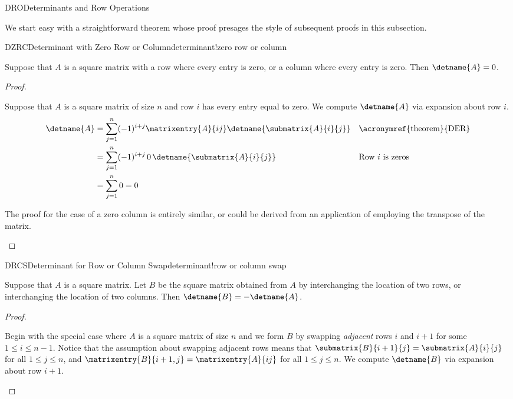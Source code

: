 \begin{subsect}{DRO}{Determinants and Row Operations}
%
\begin{para}We start easy with a straightforward theorem whose proof presages the style of subsequent proofs in this subsection.\end{para}
%
\begin{theorem}{DZRC}{Determinant with Zero Row or Column}{determinant!zero row or column}
\begin{para}Suppose that $A$ is a square matrix with a row where every entry is zero, or a column where every entry is zero.  Then $\detname{A}=0$.\end{para}
\end{theorem}
%
\begin{proof}
\begin{para}Suppose that $A$ is a square matrix of size $n$ and row $i$ has every entry equal to zero.  We compute $\detname{A}$ via expansion about row $i$.
%
\begin{align*}
\detname{A}
&=
\sum_{j=1}^{n}(-1)^{i+j}\matrixentry{A}{ij}\detname{\submatrix{A}{i}{j}}
&&\text{\acronymref{theorem}{DER}}\\
%
&=
\sum_{j=1}^{n}(-1)^{i+j}\,0\,\detname{\submatrix{A}{i}{j}}
&&\text{Row $i$ is zeros}\\
%
&=
\sum_{j=1}^{n}0=0
%
\end{align*}
\end{para}
%
\begin{para}The proof for the case of a zero column is entirely similar, or could be derived from an application of  employing the transpose of the matrix.\end{para}
\end{proof}
%
\begin{theorem}{DRCS}{Determinant for Row or Column Swap}{determinant!row or column swap}
\begin{para}Suppose that $A$ is a square matrix.  Let $B$ be the square matrix obtained from $A$ by interchanging the location of two rows, or interchanging the location of two columns.  Then $\detname{B}=-\detname{A}$.\end{para}
\end{theorem}
%
\begin{proof}
\begin{para}Begin with the special case where $A$ is a square matrix of size $n$ and we form $B$ by swapping {\em adjacent} rows $i$ and $i+1$ for some $1\leq i\leq n-1$.    Notice that the assumption about swapping adjacent rows means that $\submatrix{B}{i+1}{j}=\submatrix{A}{i}{j}$ for all $1\leq j\leq n$, and $\matrixentry{B}{i+1,j}=\matrixentry{A}{ij}$ for all $1\leq j\leq n$.  We compute $\detname{B}$ via expansion about row $i+1$.

\end{para}
\end{proof}
\end{subsect}
